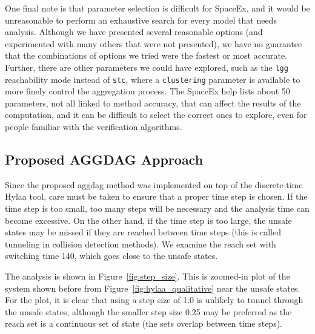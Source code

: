 One final note is that parameter selection is difficult for SpaceEx, and it would be unreasonable to perform an exhaustive search for every model
that needs analysis.
%
Although we have presented several reasonable options (and experimented with many others that were not presented), we have no guarantee that
the combinations of options we tried were the fastest or most accurate.
%
Further, there are other parameters we could have explored, such as the \texttt{lgg} reachability mode instead of \texttt{stc}, where a \texttt{clustering}
parameter is available to more finely control the aggregation process.
%
The SpaceEx help lists about 50 parameters, not all linked to method accuracy, that can affect the results of the computation,
and it can be difficult to select the correct ones to explore, even for people familiar with the verification algorithms.

\subsection{Proposed AGGDAG Approach}

Since the proposed aggdag method was implemented on top of the discrete-time Hylaa tool, care must be taken to ensure that a proper time step is chosen.
%
If the time step is too small, too many steps will be necessary and the analysis time can become excessive.
%
On the other hand, if the time step is too large, the unsafe states may be missed if they are reached between time steps
(this is called tunneling in collision detection methods).
%
We examine the reach set with switching time 140, which goes close to the unsafe states.

The analysis is shown in Figure~\ref{fig:step_size}.
%
This is zoomed-in plot of the system shown before from Figure~\ref{fig:hylaa_qualitative} near the unsafe states.
%
For the plot, it is clear that using a step size of 1.0 is unlikely to tunnel through the unsafe states,
although the smaller step size 0.25 may be preferred as the
reach set is a continuous set of state (the sets overlap between time steps).

